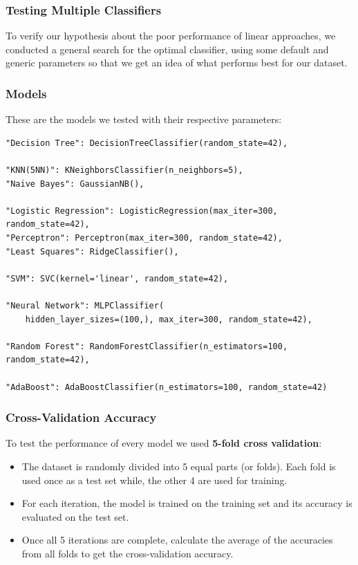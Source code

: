 \documentclass{beamer}
\begin{document}
\begin{frame}
\frametitle{Testing Multiple Classifiers}
To verify our hypothesis about the poor performance of linear approaches, we conducted a general search for the optimal classifier, using some default and generic parameters so that we get an idea of what performs best for our dataset.
\end{frame}

\begin{frame}[fragile]
\frametitle{Models}
These are the models we tested with their respective parameters: \vspace{0.5cm}
\lstset{style=PythonStyle}
\begin{lstlisting}
"Decision Tree": DecisionTreeClassifier(random_state=42),
    
"KNN(5NN)": KNeighborsClassifier(n_neighbors=5),
"Naive Bayes": GaussianNB(),

"Logistic Regression": LogisticRegression(max_iter=300, random_state=42),
"Perceptron": Perceptron(max_iter=300, random_state=42),
"Least Squares": RidgeClassifier(),

"SVM": SVC(kernel='linear', random_state=42),

"Neural Network": MLPClassifier(
    hidden_layer_sizes=(100,), max_iter=300, random_state=42),

"Random Forest": RandomForestClassifier(n_estimators=100, random_state=42),

"AdaBoost": AdaBoostClassifier(n_estimators=100, random_state=42)
\end{lstlisting}
\end{frame}

\begin{frame}
\frametitle{Cross-Validation Accuracy}
To test the performance of every model we used \textbf{5-fold cross validation}:
\begin{itemize}
    \item The dataset is randomly divided into 5 equal parts (or folds). Each fold is used once as a test set while, the other 4 are used for training.
    \item For each iteration, the model is trained on the training set and its accuracy is evaluated on the test set.
    \item Once all 5 iterations are complete, calculate the average of the accuracies from all folds to get the cross-validation accuracy.
\end{itemize}
\end{frame}
\end{document}
